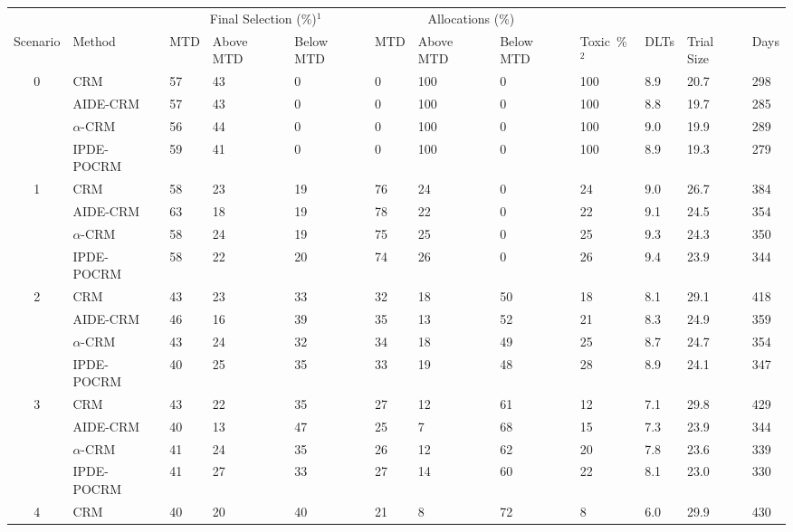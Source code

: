 \begin{tabular*}{\textwidth}{@{\extracolsep\fill}clllllllllll@{\extracolsep\fill}}
\toprule
&  & \multicolumn{3}{c}{Final Selection (\%)$^1$} & \multicolumn{3}{c}{Allocations (\%)} & &  &  &  \\
\multirow{2}{2em}{Scenario} & \multirow{2}{2em}{Method} & \multirow{2}{2em}{MTD} & \multirow{2}{2em}{Above MTD} & \multirow{2}{2em}{Below MTD} & \multirow{2}{2em}{MTD} & \multirow{2}{2em}{Above MTD} & \multirow{2}{2em}{Below MTD} & \multirow{2}{2em}{Toxic~\%$^2$} & \multirow{2}{2em}{DLTs} & \multirow{2}{2em}{Trial Size} & \multirow{2}{2em}{Days}  \\ \\ 
\midrule
\multirow{4}{2em}{0} & CRM & 57 & 43 & 0 & 0 & 100 & 0 & 100 & 8.9 & 20.7 & 298\\
 & AIDE-CRM & 57 & 43 & 0 & 0 & 100 & 0 & 100 & 8.8 & 19.7 & 285\\
 & $\alpha$-CRM & 56 & 44 & 0 & 0 & 100 & 0 & 100 & 9.0 & 19.9 & 289\\
 & IPDE-POCRM & 59 & 41 & 0 & 0 & 100 & 0 & 100 & 8.9 & 19.3 & 279\\
\midrule
\multirow{4}{2em}{1} & CRM & 58 & 23 & 19 & 76 & 24 & 0 & 24 & 9.0 & 26.7 & 384\\
 & AIDE-CRM & 63 & 18 & 19 & 78 & 22 & 0 & 22 & 9.1 & 24.5 & 354\\
 & $\alpha$-CRM & 58 & 24 & 19 & 75 & 25 & 0 & 25 & 9.3 & 24.3 & 350\\
 & IPDE-POCRM & 58 & 22 & 20 & 74 & 26 & 0 & 26 & 9.4 & 23.9 & 344\\
\midrule
\multirow{4}{2em}{2} & CRM & 43 & 23 & 33 & 32 & 18 & 50 & 18 & 8.1 & 29.1 & 418\\
 & AIDE-CRM & 46 & 16 & 39 & 35 & 13 & 52 & 21 & 8.3 & 24.9 & 359\\
 & $\alpha$-CRM & 43 & 24 & 32 & 34 & 18 & 49 & 25 & 8.7 & 24.7 & 354\\
 & IPDE-POCRM & 40 & 25 & 35 & 33 & 19 & 48 & 28 & 8.9 & 24.1 & 347\\
\midrule
\multirow{4}{2em}{3} & CRM & 43 & 22 & 35 & 27 & 12 & 61 & 12 & 7.1 & 29.8 & 429\\
 & AIDE-CRM & 40 & 13 & 47 & 25 & 7 & 68 & 15 & 7.3 & 23.9 & 344\\
 & $\alpha$-CRM & 41 & 24 & 35 & 26 & 12 & 62 & 20 & 7.8 & 23.6 & 339\\
 & IPDE-POCRM & 41 & 27 & 33 & 27 & 14 & 60 & 22 & 8.1 & 23.0 & 330\\
\midrule
\multirow{4}{2em}{4} & CRM & 40 & 20 & 40 & 21 & 8 & 72 & 8 & 6.0 & 29.9 & 430\\

\end{tabular*}
